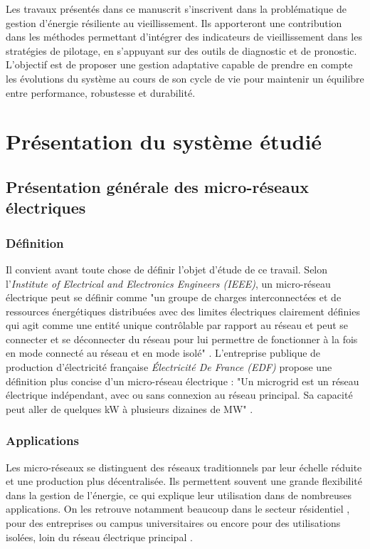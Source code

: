 Les travaux présentés dans ce manuscrit s'inscrivent dans la problématique de gestion d'énergie résiliente au vieillissement. Ils apporteront une contribution dans les méthodes permettant d'intégrer des indicateurs de vieillissement dans les stratégies de pilotage, en s'appuyant sur des outils de diagnostic et de pronostic. L'objectif est de proposer une gestion adaptative capable de prendre en compte les évolutions du système au cours de son cycle de vie pour maintenir un équilibre entre performance, robustesse et durabilité.

\section{Présentation du système étudié}
\subsection{Présentation générale des micro-réseaux électriques}
\subsubsection{Définition}
Il convient avant toute chose de définir l'objet d'étude de ce travail. Selon l'\textit{Institute of Electrical and Electronics Engineers (IEEE)}, un micro-réseau électrique peut se définir comme "un groupe de charges interconnectées et de ressources énergétiques distribuées avec des limites électriques clairement définies qui agit comme une entité unique contrôlable par rapport au réseau et peut se connecter et se déconnecter du réseau pour lui permettre de fonctionner à la fois en mode connecté au réseau et en mode isolé" \cite{noauthor_ieee_nodate}. L'entreprise publique de production d'électricité  française \textit{Électricité De France (EDF)} propose une définition plus concise d'un micro-réseau électrique : "Un microgrid est un réseau électrique indépendant, avec ou sans connexion au réseau principal. Sa capacité peut aller de quelques kW à plusieurs dizaines de MW" \cite{noauthor_microgrid_nodate}. 

\subsubsection{Applications}
Les micro-réseaux se distinguent des réseaux traditionnels par leur échelle réduite et une production plus décentralisée. Ils permettent souvent une grande flexibilité dans la gestion de l'énergie, ce qui explique leur utilisation dans de nombreuses applications. On les retrouve notamment beaucoup dans le secteur résidentiel \cite{ali_review_2021}\cite{sabry_compatibility_2020}\cite{salehi_comprehensive_2022}, pour des entreprises ou campus universitaires \cite{gomes_microgrid_2020}\cite{kermani_intelligent_2021} ou encore pour des utilisations isolées, loin du réseau électrique principal \cite{agua_decentralized_2020}\cite{elsaraf_techno-economic_2021}\cite{javed_quantitative_2022}.

